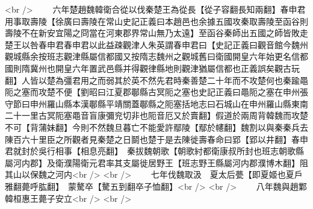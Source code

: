 <br />
　　六年楚趙魏韓衛合從以伐秦楚王為從長【從子容翻長知兩翻】春申君用事取壽陵【徐廣曰壽陵在常山史記正義曰本趙邑也余據五國攻秦取壽陵至函谷則壽陵不在新安宜陽之冏當在河東郡界常山無乃太遠】至函谷秦師出五國之師皆敗走楚王以咎春申君春申君以此益疎觀津人朱英謂春申君曰【史記正義曰觀音館今魏州觀城縣余按班志觀津縣屬信都國又按隋志魏州之觀城舊曰衛國開皇六年始更名信都國則隋冀州也開皇六年置武邑縣并得觀律縣地則觀津猶屬信都也正義誤矣觀古玩翻】人皆以楚為彊君用之而弱其於英不然先君時秦善楚二十年而不攻楚何也秦踰黽阨之塞而攻楚不便【劉昭曰江夏郡鄳縣古冥阨之塞也史記正義曰黽阨之塞在申州張守節曰申州羅山縣本漢鄳縣平靖關蓋鄳縣之阨塞括地志曰石城山在申州羅山縣東南二十一里古冥阨塞黽音盲康彌兖切非也阨音厄又於賣翻】假道於兩周背韓魏而攻楚不可【背蒲妹翻】今則不然魏旦暮亡不能愛許鄢陵【鄢於幰翻】魏割以與秦秦兵去陳百六十里臣之所觀者見秦楚之日鬬也楚于是去陳徙壽春命曰郢【郢以井翻】春申君就封於吳行相事【相息亮翻】　秦拔魏朝歌【朝歌紂都衛康叔所封也班志朝歌縣屬河内郡】及衛濮陽衛元君率其支屬徙居野王【班志野王縣屬河内郡濮博木翻】阻其山以保魏之河内<br />
<br />
　　七年伐魏取汲　夏太后甍【即夏姬也夏戶雅翻薨呼肱翻】　蒙驁卒【驁五到翻卒子恤翻】<br />
<br />
　　八年魏與趙鄴　韓桓惠王薨子安立<br />
<br />

